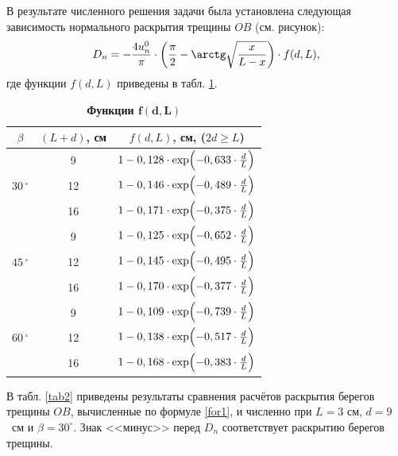\smallskip



В результате численного решения задачи была установлена следующая зависимость нормального раскрытия трещины $OB$ (см. рисунок):
\begin{equation}
D_{n}=-\frac{4u^{0}_{n}}{\pi}\cdot\left(\frac{\pi}{2}-\arctg \sqrt{\frac{x}{L-x}}\right)\cdot f(d,L),
\label{for1}
\end{equation}
где функции $f(d,L)$ приведены в табл. \ref{tab1}.

\begin{table}[b!]
\centering
\begin{minipage}[t]{128mm} 
\setlength{\extrarowheight}{1pt}
\setlength{\tabcolsep}{30pt}
\small \centering
\caption{\bf Функции $\boldsymbol{f(d,L)}$}\vspace{-3mm} 
\begin{tabular}{c|c|c}
\hline 
\footnotesize $\beta$ &\footnotesize  $(L+d)$, см &\footnotesize  $f(d,L)$, см, ($ 2 d \geq L $)\\
\hline
& 9 & \rule{0mm}{14pt}$1-0,128\cdot \exp\Bigl({-0,633\cdot \frac{d}{L}}\Bigr)$\\ 
$30\,^{\circ}$ & 12 & $1-0,146\cdot \exp\Bigl({-0,489\cdot \frac{d}{L}}\Bigr)$\\ %
& 16 & $1-0,171\cdot \exp\Bigl({-0,375\cdot \frac{d}{L}}\Bigr)$\\ \hline
& 9 & $1-0,125\cdot \exp\Bigl({-0,652\cdot \frac{d}{L}}\Bigr)$\\%
$45\,^{\circ}$ & 12 & $1-0,145\cdot \exp\Bigl({-0,495\cdot \frac{d}{L}}\Bigr)$\\ %
& 16 & $1-0,170\cdot \exp\Bigl({-0,377\cdot \frac{d}{L}}\Bigr)$\\ \hline
& 9 & $1-0,109\cdot \exp\Bigl({-0,739\cdot \frac{d}{L}}\Bigr)$\\ %
$60\,^{\circ}$ & 12 & $1-0,138\cdot \exp\Bigl({-0,517\cdot \frac{d}{L}}\Bigr)$\\ %
& 16 & $1-0,168\cdot \exp\Bigl({-0,383\cdot \frac{d}{L}}\Bigr)$\\ \hline
\end{tabular} \label{tab1}
\end{minipage}
\end{table}

В табл. \ref{tab2} приведены результаты сравнения расчётов раскрытия берегов трещины $OB$, вычисленные по формуле \eqref{for1}, и численно при  $L=3$ см, \mbox{$d=9$}~см и $\beta=30^{\circ}$. 
Знак <<минус>> перед $D_{n}$ соответствует раскрытию берегов трещины.

